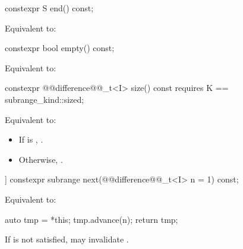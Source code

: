 %
\begin{itemdecl}
constexpr S end() const;
\end{itemdecl}

\begin{itemdescr}
\pnum
\effects Equivalent to: 
\end{itemdescr}

%
\begin{itemdecl}
constexpr bool empty() const;
\end{itemdecl}

\begin{itemdescr}
\pnum
\effects Equivalent to: 
\end{itemdescr}

%
\begin{itemdecl}
constexpr @@difference@@_t<I> size() const
  requires K == subrange_kind::sized;
\end{itemdecl}

\begin{itemdescr}
\pnum
\effects Equivalent to: 
\begin{itemize}
\item If  is , .
\item Otherwise, .
\end{itemize}
\end{itemdescr}

%
\begin{itemdecl}
[[nodiscard]] constexpr subrange next(@@difference@@_t<I> n = 1) const;
\end{itemdecl}

\begin{itemdescr}
\pnum
\effects Equivalent to:
\begin{codeblock}
auto tmp = *this;
tmp.advance(n);
return tmp;
\end{codeblock}

\pnum
\begin{note}
If  is not satisfied, 
may invalidate .
\end{note}
\end{itemdescr}


